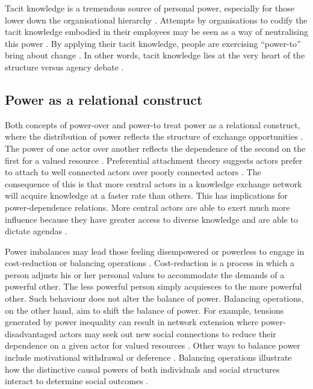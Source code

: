 Tacit knowledge is a tremendous source of personal power, especially for those lower down the organisational hierarchy \citep{bordum2002tacit,gourlay2002tacit}. Attempts by organisations to codify the tacit knowledge embodied in their employees may be seen as a way of neutralising this power \citep{schultze2004knowing,singh2019territoriality}. By applying their tacit knowledge, people are exercising \enquote{power-to} bring about change \citep{schultze2004knowing,lam2014tacit}. In other words, tacit knowledge lies at the very heart of the structure versus agency debate \citep{lam2000tacit,lam2014tacit}. 

\subsection{Power as a relational construct}

Both concepts of power-over and power-to treat power as a relational construct, where the distribution of power reflects the structure of exchange opportunities \citep{blau1964exchange,reagans2008knowledge,bonacich2009structural}. The power of one actor over another reflects the dependence of the second on the first for a valued resource \citep{emerson1962power}. Preferential attachment theory suggests actors prefer to attach to well connected actors over poorly connected actors \citep{barabasi1999emergence}. The consequence of this is that more central actors in a knowledge exchange network will acquire knowledge at a faster rate than others. This has implications for power-dependence relations. More central actors are able to exert much more influence because they have greater access to diverse knowledge and are able to dictate agendas \citep{bonacich1987power,foucault1980power}. \medskip

Power imbalances may lead those feeling disempowered or powerless to engage in cost-reduction or balancing operations \citep{emerson1962power}. Cost-reduction is a process in which a person adjusts his or her personal values to accommodate the demands of a powerful other. The less powerful person simply acquiesces to the more powerful other. Such behaviour does not alter the balance of power. Balancing operations, on the other hand, aim to shift the balance of power. For example, tensions generated by power inequality can result in network extension where power-disadvantaged actors may seek out new social connections to reduce their dependence on a given actor for valued resources \citep{cook2013social}. Other ways to balance power include motivational withdrawal or deference \citep{emerson1962power}. Balancing operations illustrate how the distinctive causal powers of both individuals and social structures interact to determine social outcomes \citep{loyal2001agency}. \medskip

